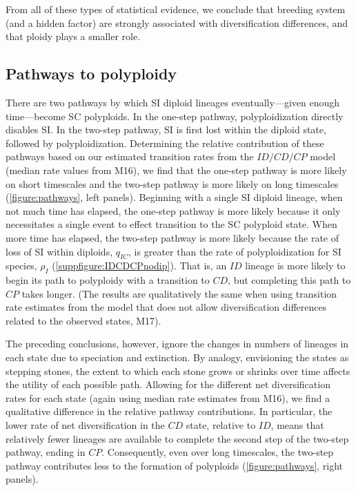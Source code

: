 From all of these types of statistical evidence, we conclude that breeding system (and a hidden factor) are strongly associated with diversification differences, and that ploidy plays a smaller role.

\subsection{Pathways to polyploidy}
There are two pathways by which SI diploid lineages eventually---given enough time---become SC polyploids.
In the one-step pathway, polyploidization directly disables SI.
In the two-step pathway, SI is first lost within the diploid state, followed by polyploidization.
Determining the relative contribution of these pathways based on our estimated transition rates from the $ID/CD/CP$ model (median rate values from M16), we find that the one-step pathway is more likely on short timescales and the two-step pathway is more likely on long timescales (\cref{figure:pathways}, left panels).
Beginning with a single SI diploid lineage, when not much time has elapsed, the one-step pathway is more likely because it only necessitates a single event to effect transition to the SC polyploid state.
When more time has elapsed, the two-step pathway is more likely because the rate of loss of SI within diploids, $q_{IC}$, is greater than the rate of polyploidization for SI species, $\rho_I$ (\cref{suppfigure:IDCDCPnodip}).
That is, an $ID$ lineage is more likely to begin its path to polyploidy with a transition to $CD$, but completing this path to $CP$ takes longer.
(The results are qualitatively the same when using transition rate estimates from the model that does not allow diversification differences related to the observed states, M17).

The preceding conclusions, however, ignore the changes in numbers of lineages in each state due to speciation and extinction.
By analogy, envisioning the states as stepping stones, the extent to which each stone grows or shrinks over time affects the utility of each possible path.
Allowing for the different net diversification rates for each state (again using median rate estimates from M16), we find a qualitative difference in the relative pathway contributions.
In particular, the lower rate of net diversification in the $CD$ state, relative to $ID$, means that relatively fewer lineages are available to complete the second step of the two-step pathway, ending in $CP$.
Consequently, even over long timescales, the two-step pathway contributes less to the formation of polyploids (\cref{figure:pathways}, right panels).

